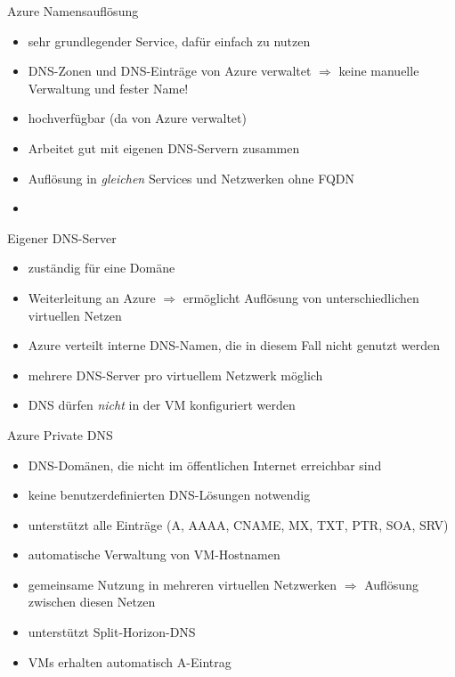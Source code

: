 \begin{flashcard}[]{Azure Namensauflösung}
  \begin{itemize}
    \item sehr grundlegender Service, dafür einfach zu nutzen
    \item DNS-Zonen und DNS-Einträge von Azure verwaltet\newline
      $\Rightarrow$ keine manuelle Verwaltung und fester Name!
    \item hochverfügbar (da von Azure verwaltet)
    \item Arbeitet gut mit eigenen DNS-Servern zusammen
    \item Auflösung in \emph{gleichen} Services und Netzwerken ohne FQDN
    \item
  \end{itemize}
\end{flashcard}

\begin{flashcard}[]{Eigener DNS-Server}
  \begin{itemize}
    \item zuständig für eine Domäne
    \item Weiterleitung an Azure\newline
      $\Rightarrow$ ermöglicht Auflösung von unterschiedlichen virtuellen Netzen
    \item Azure verteilt interne DNS-Namen, die in diesem Fall nicht genutzt werden
    \item mehrere DNS-Server pro virtuellem Netzwerk möglich
    \item[!] DNS dürfen \emph{nicht} in der VM konfiguriert werden
  \end{itemize}
\end{flashcard}

\begin{flashcard}[]{Azure Private DNS}
  \begin{itemize}
    \item DNS-Domänen, die nicht im öffentlichen Internet erreichbar sind
    \item keine benutzerdefinierten DNS-Lösungen notwendig
    \item unterstützt alle Einträge (A, AAAA, CNAME, MX, TXT, PTR, SOA, SRV)
    \item automatische Verwaltung von VM-Hostnamen
    \item gemeinsame Nutzung in mehreren virtuellen Netzwerken\newline
      $\Rightarrow$ Auflösung zwischen diesen Netzen
    \item unterstützt Split-Horizon-DNS
    \item VMs erhalten automatisch A-Eintrag
  \end{itemize}
\end{flashcard}

